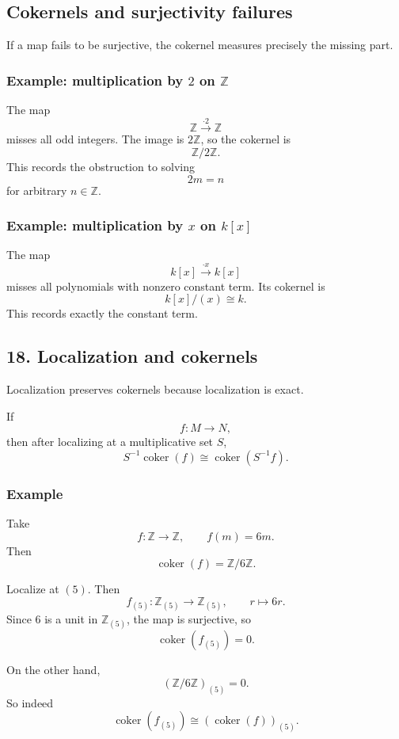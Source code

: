 \documentclass[12pt,a4paper]{article}
\theoremstyle{notespace}
\theoremstyle{definition}
\begin{document}
\subsection{ Cokernels and surjectivity failures}

If a map fails to be surjective, the cokernel measures precisely the missing part.

\subsubsection*{Example: multiplication by \(2\) on \(\mathbb Z\)}

The map
\[
\mathbb Z\xrightarrow{\cdot 2}\mathbb Z
\]
misses all odd integers.
The image is \(2\mathbb Z\), so the cokernel is
\[
\mathbb Z/2\mathbb Z.
\]
This records the obstruction to solving
\[
2m=n
\]
for arbitrary \(n\in \mathbb Z\).

\subsubsection*{Example: multiplication by \(x\) on \(k[x]\)}

The map
\[
k[x]\xrightarrow{\cdot x}k[x]
\]
misses all polynomials with nonzero constant term.
Its cokernel is
\[
k[x]/(x)\cong k.
\]
This records exactly the constant term.

\subsection{18. Localization and cokernels}

Localization preserves cokernels because localization is exact.

If
\[
f:M\to N,
\]
then after localizing at a multiplicative set \(S\),
\[
S^{-1}\operatorname{coker}(f)\cong \operatorname{coker}(S^{-1}f).
\]

\subsubsection*{Example}

Take
\[
f:\mathbb Z\to\mathbb Z,
\qquad
f(m)=6m.
\]
Then
\[
\operatorname{coker}(f)=\mathbb Z/6\mathbb Z.
\]

Localize at \((5)\). Then
\[
f_{(5)}:\mathbb Z_{(5)}\to\mathbb Z_{(5)},
\qquad
r\mapsto 6r.
\]
Since \(6\) is a unit in \(\mathbb Z_{(5)}\), the map is surjective, so
\[
\operatorname{coker}(f_{(5)})=0.
\]

On the other hand,
\[
(\mathbb Z/6\mathbb Z)_{(5)}=0.
\]
So indeed
\[
\operatorname{coker}(f_{(5)})\cong (\operatorname{coker}(f))_{(5)}.
\]
\end{document}
